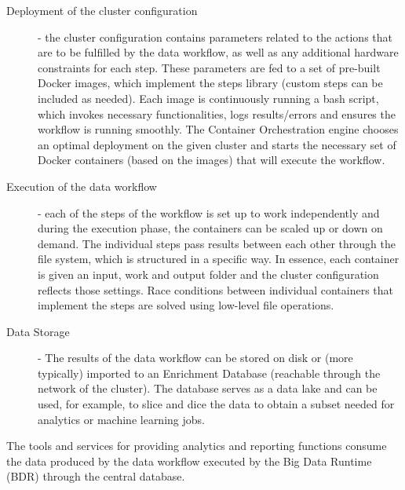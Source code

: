 \begin{description}
    \item[Deployment of the cluster configuration] - the cluster configuration contains parameters related to the actions that are to be fulfilled by the data workflow, as well as any additional hardware constraints for each step. These parameters are fed to a set of pre-built Docker images, which implement the steps library (custom steps can be included as needed). Each image is continuously running a bash script, which invokes necessary functionalities, logs results/errors and ensures the workflow is running smoothly. The Container Orchestration engine chooses an optimal deployment on the given cluster and starts the necessary set of Docker containers (based on the images) that will execute the workflow. 
    \item[Execution of the data workflow] - each of the steps of the workflow is set up to work independently and during the execution phase, the containers can be scaled up or down on demand. The individual steps pass results between each other through the file system, which is structured in a specific way. In essence, each container is given an input, work and output folder and the cluster configuration reflects those settings. Race conditions between individual containers that implement the steps are solved using low-level file operations.
    \item[Data Storage] - The results of the data workflow can be stored on disk or (more typically) imported to an Enrichment Database (reachable through the network of the cluster). The database serves as a data lake and can be used, for example, to slice and dice the data to obtain a subset needed for analytics or machine learning jobs. 
\end{description} 
The tools and services for providing analytics and reporting functions consume the data produced by the data workflow executed by the Big Data Runtime (BDR) through the central database.
